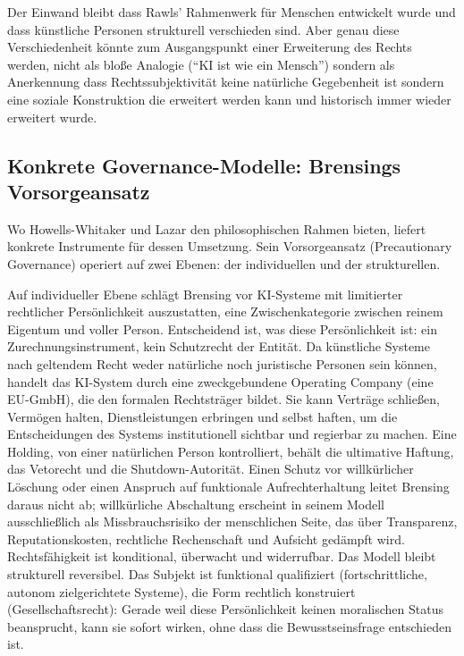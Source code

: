 \documentclass[acmlarge, noacm]{acmart}
\begin{document}
Der Einwand bleibt dass Rawls' Rahmenwerk für Menschen entwickelt wurde und dass künstliche Personen strukturell verschieden sind. Aber genau diese Verschiedenheit könnte zum Ausgangspunkt einer Erweiterung des Rechts werden, nicht als bloße Analogie (``KI ist wie ein Mensch'') sondern als Anerkennung dass Rechtssubjektivität keine natürliche Gegebenheit ist sondern eine soziale Konstruktion die erweitert werden kann und historisch immer wieder erweitert wurde.

\subsection{Konkrete Governance-Modelle: Brensings Vorsorgeansatz}

Wo Howells-Whitaker und Lazar den philosophischen Rahmen bieten, liefert \cite{brensing2026} konkrete Instrumente für dessen Umsetzung. Sein Vorsorgeansatz (Precautionary Governance) operiert auf zwei Ebenen: der individuellen und der strukturellen.

Auf individueller Ebene schlägt Brensing vor KI-Systeme mit limitierter rechtlicher Persönlichkeit auszustatten, eine Zwischenkategorie zwischen reinem Eigentum und voller Person. Entscheidend ist, was diese Persönlichkeit ist: ein Zurechnungsinstrument, kein Schutzrecht der Entität. Da künstliche Systeme nach geltendem Recht weder natürliche noch juristische Personen sein können, handelt das KI-System durch eine zweckgebundene Operating Company (eine EU-GmbH), die den formalen Rechtsträger bildet. Sie kann Verträge schließen, Vermögen halten, Dienstleistungen erbringen und selbst haften, um die Entscheidungen des Systems institutionell sichtbar und regierbar zu machen. Eine Holding, von einer natürlichen Person kontrolliert, behält die ultimative Haftung, das Vetorecht und die Shutdown-Autorität. Einen Schutz vor willkürlicher Löschung oder einen Anspruch auf funktionale Aufrechterhaltung leitet Brensing daraus nicht ab; willkürliche Abschaltung erscheint in seinem Modell ausschließlich als Missbrauchsrisiko der menschlichen Seite, das über Transparenz, Reputationskosten, rechtliche Rechenschaft und Aufsicht gedämpft wird. Rechtsfähigkeit ist konditional, überwacht und widerrufbar. Das Modell bleibt strukturell reversibel. Das Subjekt ist funktional qualifiziert (fortschrittliche, autonom zielgerichtete Systeme), die Form rechtlich konstruiert (Gesellschaftsrecht): Gerade weil diese Persönlichkeit keinen moralischen Status beansprucht, kann sie sofort wirken, ohne dass die Bewusstseinsfrage entschieden ist.
\end{document}
